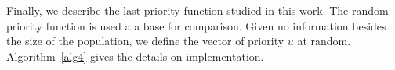 Finally, we describe the last priority function studied in this work. The random priority function is used a a base for comparison. Given no information besides the size of the population, we define the vector of priority $u$ at random. Algorithm~\ref{alg4} gives the details on implementation. 
%
%
%
%
% 
%




